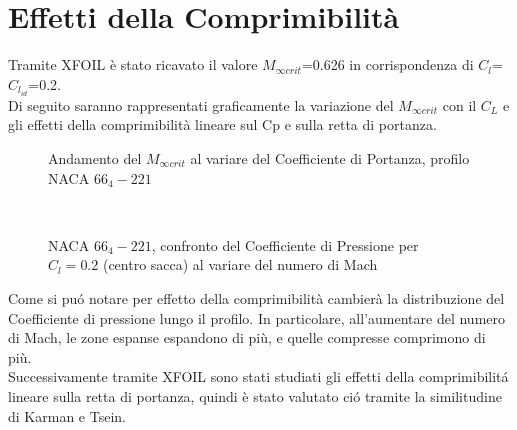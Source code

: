 \chapter{Effetti della Comprimibilità}

Tramite XFOIL è stato ricavato il valore $M_{\infty crit}$=0.626 in corrispondenza di $C_l$=$C_{l_{id}}$=0.2. \\
Di seguito saranno rappresentati graficamente la variazione del $M_{\infty crit}$ con il $C_L$ e gli effetti della comprimibilità lineare sul Cp e sulla retta di portanza.\\ 

\begin{figure} [H]
\centering
{}
\caption{\footnotesize Andamento del $ M_{\infty crit} $  al variare del Coefficiente di Portanza, profilo NACA $66_4-221$}
\end{figure}
\noindent \\


\begin{figure} [h!]
\centering
{}
\caption{\footnotesize NACA $66_4-221$, confronto del Coefficiente di Pressione per $C_l=0.2$ (centro sacca) al variare del numero di Mach}
\end{figure}


Come si puó notare per effetto della comprimibilità cambierà la distribuzione del Coefficiente di pressione lungo il profilo. In particolare, all’aumentare del numero di Mach, le zone espanse espandono di più, e quelle compresse comprimono di più.\\
Successivamente tramite XFOIL sono stati studiati gli effetti della comprimibilitá lineare sulla retta di portanza, quindi è stato valutato ció tramite la similitudine di Karman e Tsein.


